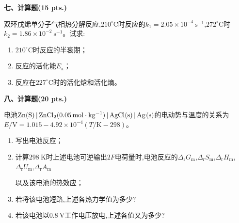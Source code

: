 \vspace{0.5cm}
\noindent\textbf{七、计算题(15 pts.)}

双环戊烯单分子气相热分解反应,$210^\circ\mathrm{C}$时反应的$k_1=2.05\times10^{-4}\ \mathrm{s^{-1}}$,$272^\circ\mathrm{C}$时$k_2=1.86\times10^{-2}\ \mathrm{s^{-1}}$。试求:
\begin{enumerate}[label=(\arabic*), itemsep=1ex]
    \item $210^\circ\mathrm{C}$时反应的半衰期；
    \item 反应的活化能$E_\mathrm{a}$；
    \item 反应在$227^\circ\mathrm{C}$时的活化焓和活化熵。
\end{enumerate}

\vspace{0.5cm}
\noindent\textbf{八、计算题(20 pts.)}

电池$\ce{Zn(S) | ZnCl2(0.05mol\cdot kg^{-1}) | AgCl(s) | Ag(s)}$的电动势与温度的关系为$E/\mathrm{V}=1.015-4.92\times10^{-4}(T/\mathrm{K}-298)$。
\begin{enumerate}[label=(\arabic*), itemsep=1ex]
    \item 写出电池反应；
    \item 计算$298\ \mathrm{K}$时上述电池可逆输出$2F$电荷量时,电池反应的$\Delta_\mathrm{r}G_\mathrm{m}$,$\Delta_\mathrm{r}S_\mathrm{m}$,$\Delta_\mathrm{r}H_\mathrm{m}$,$\Delta_\mathrm{r}U_\mathrm{m}$,$\Delta_\mathrm{r}A_\mathrm{m}$
    
    以及该电池的热效应；
    \item 若将该电池短路,上述各热力学值为多少?
    \item 若该电池以$0.8\ \mathrm{V}$工作电压放电,上述各值又为多少?
\end{enumerate}